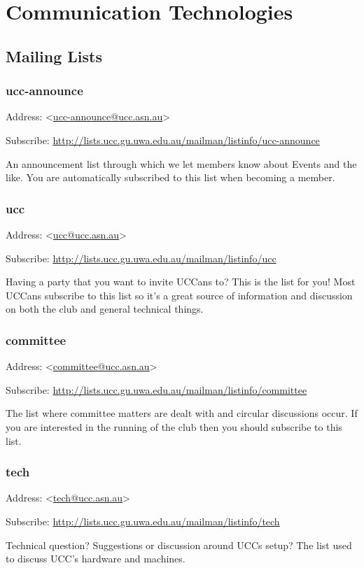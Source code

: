\chapter{Communication Technologies}\label{Communications}


\newenvironment{ucclist}[1]
{
	\begin{mdframed}
	\subsection{#1}
	\begin{mdframed}
		Address:  <\href{mailto:#1@ucc.asn.au}{#1@ucc.asn.au}>
	\end{mdframed}
	\begin{mdframed}
		Subscribe:  \url{http://lists.ucc.gu.uwa.edu.au/mailman/listinfo/#1}
	\end{mdframed}


	
}{\end{mdframed}}

\section{Mailing Lists}


\begin{ucclist}{ucc-announce}

An announcement list through which we let 
members know about Events and the like. You are automatically 
subscribed to this list when becoming a member. 

\end{ucclist}

\begin{ucclist}{ucc}

Having a party that you want to invite UCCans to? This is the 
list for you! Most UCCans subscribe to this list so it's a great 
source of information and discussion on both the club and general 
technical things. 

\end{ucclist}

\begin{ucclist}{committee}
The list where committee matters are dealt with and circular 
discussions occur. If you are interested in the running of the club then 
you should subscribe to this list. 
\end{ucclist}

\begin{ucclist}{tech}
Technical question? Suggestions or discussion around UCCs setup? 
The list used to discuss UCC's hardware and machines. 
\end{ucclist}


